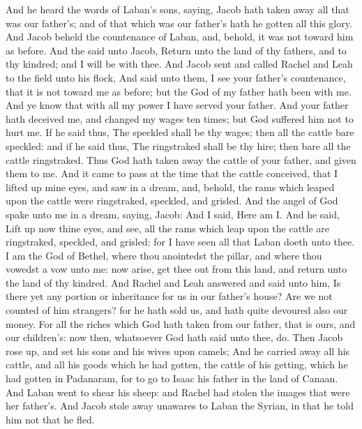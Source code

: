 \begin{biblechapter} %
 And he heard the words of Laban's sons, saying, Jacob hath taken away all that was our father's; and of that which was our father's hath he gotten all this glory.
\verse And Jacob beheld the countenance of Laban, and, behold, it was not toward him as before.
\verse And the \LORD said unto Jacob, Return unto the land of thy fathers, and to thy kindred; and I will be with thee.
\verse And Jacob sent and called Rachel and Leah to the field unto his flock,
\verse And said unto them, I see your father's countenance, that it is not toward me as before; but the God of my father hath been with me.
\verse And ye know that with all my power I have served your father.
\verse And your father hath deceived me, and changed my wages ten times; but God suffered him not to hurt me.
\verse If he said thus, The speckled shall be thy wages; then all the cattle bare speckled: and if he said thus, The ringstraked shall be thy hire; then bare all the cattle ringstraked.
\verse Thus God hath taken away the cattle of your father, and given them to me.
\verse And it came to pass at the time that the cattle conceived, that I lifted up mine eyes, and saw in a dream, and, behold, the rams which leaped upon the cattle were ringstraked, speckled, and grisled.
\verse And the angel of God spake unto me in a dream, saying, Jacob: And I said, Here am I.
\verse And he said, Lift up now thine eyes, and see, all the rams which leap upon the cattle are ringstraked, speckled, and grisled: for I have seen all that Laban doeth unto thee.
\verse I am the God of Bethel, where thou anointedst the pillar, and where thou vowedst a vow unto me: now arise, get thee out from this land, and return unto the land of thy kindred.
\verse And Rachel and Leah answered and said unto him, Is there yet any portion or inheritance for us in our father's house?
\verse Are we not counted of him strangers? for he hath sold us, and hath quite devoured also our money.
\verse For all the riches which God hath taken from our father, that is ours, and our children's: now then, whatsoever God hath said unto thee, do.
\verse Then Jacob rose up, and set his sons and his wives upon camels;
\verse And he carried away all his cattle, and all his goods which he had gotten, the cattle of his getting, which he had gotten in Padanaram, for to go to Isaac his father in the land of Canaan.
\verse And Laban went to shear his sheep: and Rachel had stolen the images that were her father's.
\verse And Jacob stole away unawares to Laban the Syrian, in that he told him not that he fled.

\end{biblechapter}
